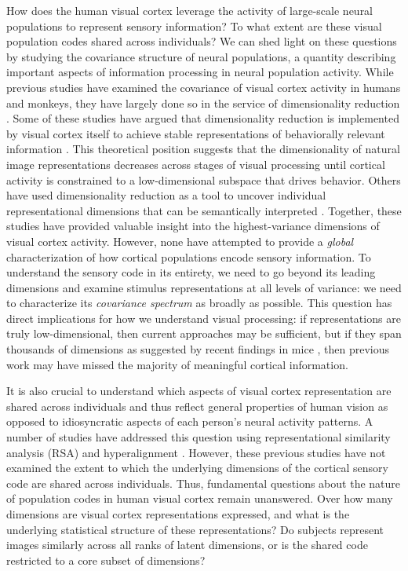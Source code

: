 \documentclass[10pt]{article}
\begin{document}
How does the human visual cortex leverage the activity of large-scale neural populations to represent sensory information? To what extent are these visual population codes shared across individuals? We can shed light on these questions by studying the covariance structure of neural populations, a quantity describing important aspects of information processing in neural population activity. While previous studies have examined the covariance of visual cortex activity in humans and monkeys, they have largely done so in the service of dimensionality reduction \autocite{Khosla2022,Tarhan2020,Haxby2011,Huth2012}. Some of these studies have argued that dimensionality reduction is implemented by visual cortex itself to achieve stable representations of behaviorally relevant information \autocite{Lehky2014,Lehky2016,Fusi2016}. This theoretical position suggests that the dimensionality of natural image representations decreases across stages of visual processing until cortical activity is constrained to a low-dimensional subspace that drives behavior. Others have used dimensionality reduction as a tool to uncover individual representational dimensions that can be semantically interpreted \autocite{Thorat2019,Connolly2012,Huth2012,Khosla2022}. Together, these studies have provided valuable insight into the highest-variance dimensions of visual cortex activity. However, none have attempted to provide a \emph{global} characterization of how cortical populations encode sensory information. To understand the sensory code in its entirety, we need to go beyond its leading dimensions and examine stimulus representations at all levels of variance: we need to characterize its \emph{covariance spectrum} as broadly as possible. This question has direct implications for how we understand visual processing: if representations are truly low-dimensional, then current approaches may be sufficient, but if they span thousands of dimensions as suggested by recent findings in mice \autocite{Stringer2019}, then previous work may have missed the majority of meaningful cortical information.

It is also crucial to understand which aspects of visual cortex representation are shared across individuals and thus reflect general properties of human vision as opposed to idiosyncratic aspects of each person's neural activity patterns. A number of studies have addressed this question using representational similarity analysis (RSA) and hyperalignment \autocite{Kriegeskorte2008,Haxby2011,Haxby2020}. However, these previous studies have not examined the extent to which the underlying dimensions of the cortical sensory code are shared across individuals. Thus, fundamental questions about the nature of population codes in human visual cortex remain unanswered. Over how many dimensions are visual cortex representations expressed, and what is the underlying statistical structure of these representations? Do subjects represent images similarly across all ranks of latent dimensions, or is the shared code restricted to a core subset of dimensions?
\end{document}
